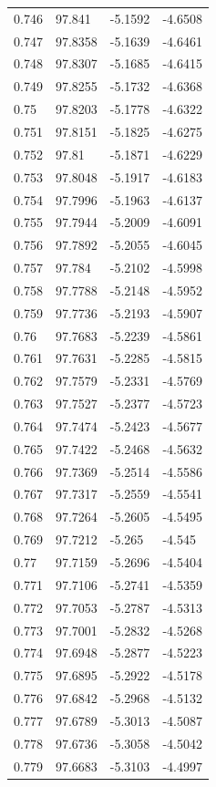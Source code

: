 \begin{tabular}{llll}
0.746 & 97.841 & -5.1592 & -4.6508 \\
0.747 & 97.8358 & -5.1639 & -4.6461 \\
0.748 & 97.8307 & -5.1685 & -4.6415 \\
0.749 & 97.8255 & -5.1732 & -4.6368 \\
0.75 & 97.8203 & -5.1778 & -4.6322 \\
0.751 & 97.8151 & -5.1825 & -4.6275 \\
0.752 & 97.81 & -5.1871 & -4.6229 \\
0.753 & 97.8048 & -5.1917 & -4.6183 \\
0.754 & 97.7996 & -5.1963 & -4.6137 \\
0.755 & 97.7944 & -5.2009 & -4.6091 \\
0.756 & 97.7892 & -5.2055 & -4.6045 \\
0.757 & 97.784 & -5.2102 & -4.5998 \\
0.758 & 97.7788 & -5.2148 & -4.5952 \\
0.759 & 97.7736 & -5.2193 & -4.5907 \\
0.76 & 97.7683 & -5.2239 & -4.5861 \\
0.761 & 97.7631 & -5.2285 & -4.5815 \\
0.762 & 97.7579 & -5.2331 & -4.5769 \\
0.763 & 97.7527 & -5.2377 & -4.5723 \\
0.764 & 97.7474 & -5.2423 & -4.5677 \\
0.765 & 97.7422 & -5.2468 & -4.5632 \\
0.766 & 97.7369 & -5.2514 & -4.5586 \\
0.767 & 97.7317 & -5.2559 & -4.5541 \\
0.768 & 97.7264 & -5.2605 & -4.5495 \\
0.769 & 97.7212 & -5.265 & -4.545 \\
0.77 & 97.7159 & -5.2696 & -4.5404 \\
0.771 & 97.7106 & -5.2741 & -4.5359 \\
0.772 & 97.7053 & -5.2787 & -4.5313 \\
0.773 & 97.7001 & -5.2832 & -4.5268 \\
0.774 & 97.6948 & -5.2877 & -4.5223 \\
0.775 & 97.6895 & -5.2922 & -4.5178 \\
0.776 & 97.6842 & -5.2968 & -4.5132 \\
0.777 & 97.6789 & -5.3013 & -4.5087 \\
0.778 & 97.6736 & -5.3058 & -4.5042 \\
0.779 & 97.6683 & -5.3103 & -4.4997 \\

\end{tabular}
